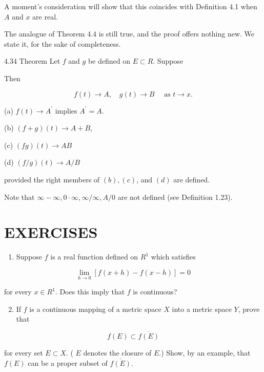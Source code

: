 \documentclass[10pt]{article}
\begin{document}
A moment's consideration will show that this coincides with Definition 4.1 when $A$ and $x$ are real.

The analogue of Theorem 4.4 is still true, and the proof offers nothing new. We state it, for the sake of completeness.

4.34 Theorem Let $f$ and $g$ be defined on $E \subset R$. Suppose

Then

$$
f(t) \rightarrow A, \quad g(t) \rightarrow B \quad \text { as } t \rightarrow x .
$$

(a) $f(t) \rightarrow A^{\prime}$ implies $A^{\prime}=A$.

(b) $(f+g)(t) \rightarrow A+B$,

(c) $(f g)(t) \rightarrow A B$

(d) $(f / g)(t) \rightarrow A / B$

provided the right members of $(b),(c)$, and $(d)$ are defined.

Note that $\infty-\infty, 0 \cdot \infty, \infty / \infty, A / 0$ are not defined (see Definition 1.23).

\section{EXERCISES}
\begin{enumerate}
  \item Suppose $f$ is a real function defined on $R^{1}$ which satisfies
\end{enumerate}

$$
\lim _{h \rightarrow 0}[f(x+h)-f(x-h)]=0
$$

for every $x \in R^{1}$. Does this imply that $f$ is continuous?

\begin{enumerate}
  \setcounter{enumi}{1}
  \item If $f$ is a continuous mapping of a metric space $X$ into a metric space $Y$, prove that
\end{enumerate}

$$
f(E) \subset \overline{f(E)}
$$

for every set $E \subset X$. ( $E$ denotes the closure of $E$.) Show, by an example, that $f(E)$ can be a proper subset of $\overline{f(E)}$.
\end{document}
